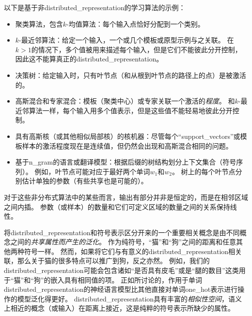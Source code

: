 以下是基于非\gls{distributed_representation}的学习算法的示例：
\begin{itemize}
	\item 聚类算法，包含$k$-均值算法：每个输入点恰好分配到一个类别。

	\item $k$-最近邻算法：给定一个输入，一个或几个模板或原型示例与之关联。
	在$k > 1$的情况下，多个值被用来描述每个输入，但是它们不能彼此分开控制，因此这不能算真正的\gls{distributed_representation}。

	\item 决策树：给定输入时，只有叶节点（和从根到叶节点的路径上的点）是被激活的。

	\item 高斯混合和专家混合：模板（聚类中心）或专家关联一个激活的\emph{程度}。
	和$k$-最近邻算法一样，每个输入用多个值表示，但是这些值不能轻易地彼此分开控制。

	\item 具有高斯核（或其他相似局部核）的核机器：尽管每个``\gls{support_vectors}''或模板样本的激活程度现在是连续值，但仍然会出现和高斯混合相同的问题。

	\item 基于\gls{n_gram}的语言或翻译模型：根据后缀的树结构划分上下文集合（符号序列）。
	例如，叶节点可能对应于最好两个单词$w_1$和$w_2$。
	树上的每个叶节点分别估计单独的参数（有些共享也是可能的）。
\end{itemize}


对于这些非分布式算法中的某些而言，输出有部分并非是恒定的，而是在相邻区域之间内插。
参数（或样本）的数量和它们可定义区域的数量之间的关系保持线性。


将\gls{distributed_representation}和符号表示区分开来的一个重要相关概念是由不同概念之间的\emph{共享属性而产生的泛化}。
作为纯符号，``猫''和``狗''之间的距离和任意其他两种符号一样。
然而，如果将它们与有意义的\gls{distributed_representation}相关联，那么关于猫的很多特点可以推广到狗，反之亦然。
例如，我们的\gls{distributed_representation}可能会包含诸如``是否具有皮毛''或是``腿的数目''这类用于``猫''和``狗''的嵌入具有相同值的项。
正如所讨论的，作用于单词\gls{distributed_representation}的神经语言模型比其他直接对单词\gls{one_hot}表示进行操作的模型泛化得更好。
\gls{distributed_representation}具有丰富的\emph{相似性空间}，语义上相近的概念（或输入）在距离上接近，这是纯粹的符号表示所缺少的属性。


